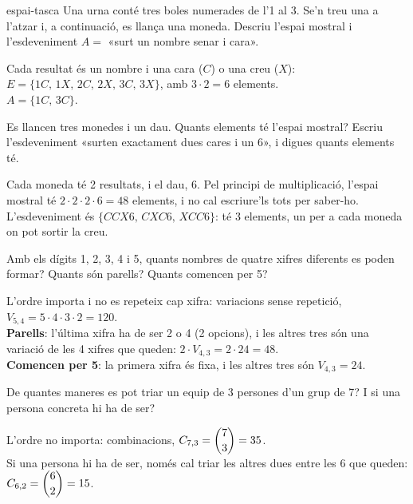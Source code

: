 \begin{apartats}

\begin{tria}{espai-tasca}
Una urna conté tres boles numerades de l'1 al 3. Se'n treu una a l'atzar i, a continuació, es llança una
moneda. Descriu l'espai mostral i l'esdeveniment $A=$ «surt un nombre senar i cara».

\begin{solucio}
Cada resultat és un nombre i una cara ($C$) o una creu ($X$): $E=\{1C,\,1X,\,2C,\,2X,\,3C,\,3X\}$, amb
$3\cdot2=6$ elements.\\
$A=\{1C,\,3C\}$.
\end{solucio}

Es llancen tres monedes i un dau. Quants elements té l'espai mostral? Escriu l'esdeveniment «surten
exactament dues cares i un 6», i digues quants elements té.

\begin{solucio}
Cada moneda té 2 resultats, i el dau, 6. Pel principi de multiplicació, l'espai mostral té
$2\cdot2\cdot2\cdot6=48$ elements, i no cal escriure'ls tots per saber-ho.\\
L'esdeveniment és $\{CCX6,\,CXC6,\,XCC6\}$: té 3 elements, un per a cada moneda on pot sortir la creu.
\end{solucio}
\end{tria}

Amb els dígits 1, 2, 3, 4 i 5, quants nombres de quatre xifres diferents es poden formar? Quants són
parells? Quants comencen per 5?

\begin{solucio}
L'ordre importa i no es repeteix cap xifra: variacions sense repetició,
$V_{5,4}=5\cdot4\cdot3\cdot2=120$.\\
\textbf{Parells}: l'última xifra ha de ser 2 o 4 (2 opcions), i les altres tres són una variació de les
4 xifres que queden: $2\cdot V_{4,3}=2\cdot24=48$.\\
\textbf{Comencen per 5}: la primera xifra és fixa, i les altres tres són $V_{4,3}=24$.
\end{solucio}

\begin{nomesllarg}
De quantes maneres es pot triar un equip de 3 persones d'un grup de 7? I si una persona concreta hi ha
de ser?

\begin{solucio}
L'ordre no importa: combinacions, $C_{7,3}=\dbinom73=35$.\\
Si una persona hi ha de ser, només cal triar les altres dues entre les 6 que queden:
$C_{6,2}=\dbinom62=15$.
\end{solucio}
\end{nomesllarg}

\end{apartats}
